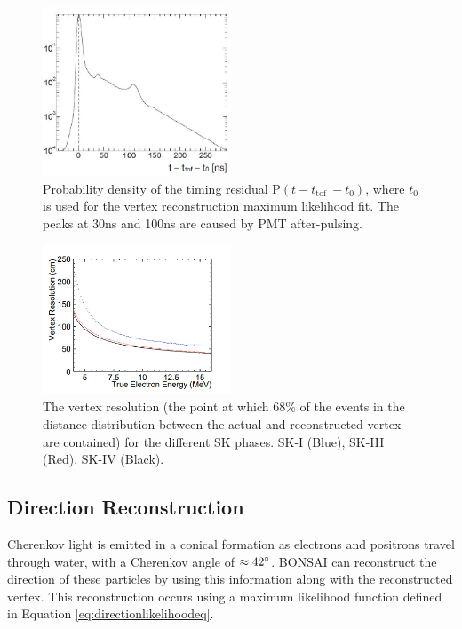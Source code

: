 \begin{figure}
    \centering
    \includegraphics[width=0.5\textwidth]{Figures/bonsai_pdf_res.png}
\caption{Probability density of the timing residual P$(t-t_{\text {tof }}-t_{0})$, where $t_{0}$ is used for the vertex reconstruction maximum likelihood fit. The peaks at 30ns and 100ns are caused by PMT after-pulsing.}
    \label{fig:bonsaihittof}
\end{figure}

\begin{figure}
    \centering
    \includegraphics[width=0.5\textwidth]{Figures/bonsai_vertex_res.png}
\caption{The vertex resolution (the point at which 68\% of the events in the distance distribution between the actual and reconstructed vertex are contained) for the different SK phases. SK-I (Blue), SK-III (Red), SK-IV (Black).}
    \label{fig:bonsaivertexres}
\end{figure}

\subsection{Direction Reconstruction}

Cherenkov light is emitted in a conical formation as electrons and positrons travel through water, with a Cherenkov angle of $\approx 42\degree$. BONSAI can reconstruct the direction of these particles by using this information along with the reconstructed vertex. This reconstruction occurs using a maximum likelihood function defined in Equation \ref{eq:directionlikelihoodeq}.

